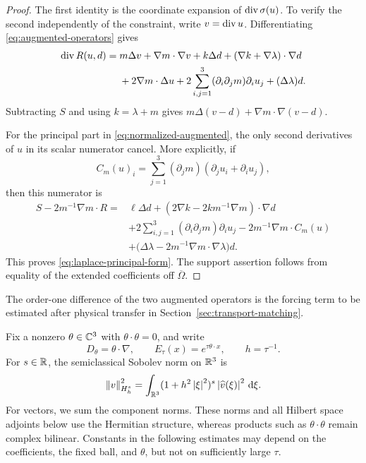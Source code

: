 \begin{proof}
The first identity is the coordinate expansion of $\operatorname{div}\sigma(u)$.
To verify the second independently of the constraint, write
$v=\operatorname{div} u$. Differentiating \eqref{eq:augmented-operators} gives
\[
\begin{aligned}
 \operatorname{div} R(u,d)
 ={}&m\Delta v+\nabla m\cdot\nabla v+k\Delta d
       +(\nabla k+\nabla\lambda)\cdot\nabla d\\
    &+2\nabla m\cdot\Delta u
       +2\sum_{i,j=1}^3(\partial_i\partial_jm)\partial_iu_j
       +(\Delta\lambda)d.
\end{aligned}
\]
Subtracting $S$ and using $k=\lambda+m$ gives
$m\Delta(v-d)+\nabla m\cdot\nabla(v-d)$.

For the principal part in \eqref{eq:normalized-augmented}, the only
second derivatives of $u$ in its scalar numerator cancel. More
explicitly, if
\[
 C_m(u)_i=\sum_{j=1}^3(\partial_jm)
                   (\partial_ju_i+\partial_iu_j),
\]
then this numerator is
\[
\begin{aligned}
 S-2m^{-1}\nabla m\cdot R
 ={}&\ell\Delta d+
   (2\nabla k-2km^{-1}\nabla m)\cdot\nabla d\\
 &+2\sum_{i,j=1}^3(\partial_i\partial_jm)\partial_iu_j
   -2m^{-1}\nabla m\cdot C_m(u)\\
 &+\bigl(\Delta\lambda-2m^{-1}\nabla m\cdot\nabla\lambda\bigr)d.
\end{aligned}
\]
This proves \eqref{eq:laplace-principal-form}. The support assertion follows
from equality of the extended coefficients off $\overline\Omega$.
\end{proof}

The order-one difference of the two augmented operators is the forcing
term to be estimated after physical transfer in
Section~\ref{sec:transport-matching}.

Fix a nonzero $\theta\in\mathbb C^3$ with $\theta\cdot\theta=0$, and write
\begin{equation}
\label{eq:phase-notation}
 D_\theta=\theta\cdot\nabla,\qquad
 E_\tau(x)=e^{\tau\theta\cdot x},\qquad h=\tau^{-1}.
\end{equation}
For $s\in\mathbb R$, the semiclassical Sobolev norm on $\mathbb R^3$ is
\[
 \left\lVert v\right\rVert_{H_h^s}^2
 =\int_{\mathbb R^3}(1+h^2\left\lvert \xi\right\rvert^2)^s
                    \left\lvert \widehat v(\xi)\right\rvert^2\,\mathrm d\xi.
\]
For vectors, we sum the component norms. These norms and all Hilbert
space adjoints below use the Hermitian structure, whereas products
such as $\theta\cdot\theta$ remain complex bilinear. Constants in the
following estimates may depend on the coefficients, the fixed ball,
and $\theta$, but not on sufficiently large $\tau$.

